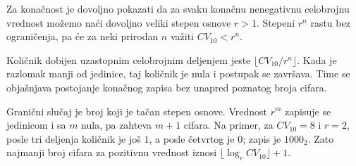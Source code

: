 
Za konačnost je dovoljno pokazati da za svaku konačnu nenegativnu celobrojnu vrednost možemo naći dovoljno veliki stepen osnove $r>1$. Stepeni $r^n$ rastu bez ograničenja, pa će za neki prirodan $n$ važiti $CV_{10}<r^n$.

Količnik dobijen uzastopnim celobrojnim deljenjem jeste $\lfloor CV_{10}/r^n\rfloor$. Kada je razlomak manji od jedinice, taj količnik je nula i postupak se završava. Time se objašnjava postojanje konačnog zapisa bez unapred poznatog broja cifara.

Granični slučaj je broj koji je tačan stepen osnove. Vrednost $r^m$ zapisuje se jedinicom i sa $m$ nula, pa zahteva $m+1$ cifara. Na primer, za $CV_{10}=8$ i $r=2$, posle tri deljenja količnik je još $1$, a posle četvrtog je $0$; zapis je $1000_2$. Zato najmanji broj cifara za pozitivnu vrednost iznosi $\lfloor\log_r CV_{10}\rfloor+1$.
